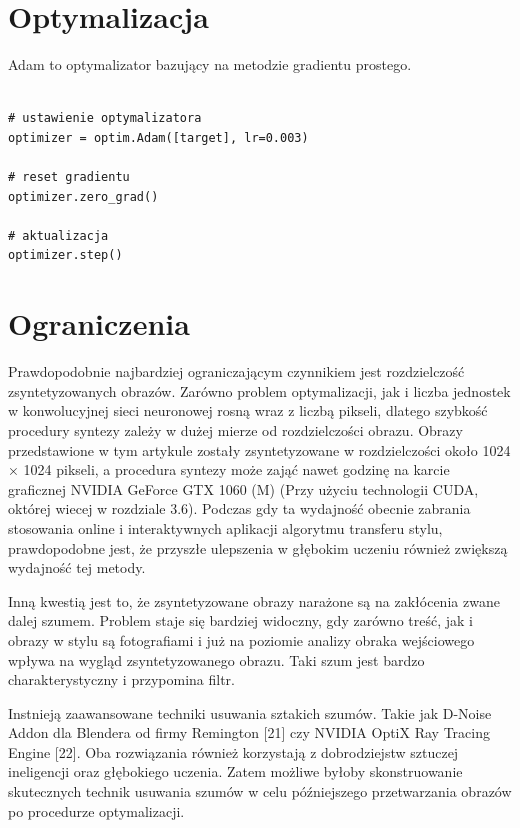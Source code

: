 \documentclass[brudnopis]{xmgr}
\begin{document}
\section{Optymalizacja\label{s:dsssl}}

Adam to optymalizator bazujący na metodzie gradientu prostego.

\begin{lstlisting}

# ustawienie optymalizatora
optimizer = optim.Adam([target], lr=0.003)
      
# reset gradientu
optimizer.zero_grad()
      
# aktualizacja
optimizer.step()

\end{lstlisting}

						
\section{Ograniczenia\label{s:dsssl}}

Prawdopodobnie najbardziej ograniczającym czynnikiem jest rozdzielczość zsyntetyzowanych obrazów. Zarówno problem optymalizacji, jak i liczba jednostek w konwolucyjnej sieci neuronowej rosną wraz z liczbą pikseli, dlatego szybkość procedury syntezy zależy w dużej mierze od rozdzielczości obrazu. Obrazy przedstawione w tym artykule zostały zsyntetyzowane w rozdzielczości około 1024 × 1024 pikseli, a procedura syntezy może zająć nawet godzinę na karcie graficznej NVIDIA GeForce GTX 1060 (M) (Przy użyciu technologii CUDA, októrej wiecej w rozdziale 3.6). Podczas gdy ta wydajność obecnie zabrania stosowania online i interaktywnych aplikacji algorytmu transferu stylu, prawdopodobne jest, że przyszłe ulepszenia w głębokim uczeniu również zwiększą wydajność tej metody.


Inną kwestią jest to, że zsyntetyzowane obrazy narażone są na zakłócenia zwane dalej szumem.  Problem staje się bardziej widoczny, gdy zarówno treść, jak i obrazy w stylu są fotografiami i już na poziomie analizy obraka wejściowego wpływa na wygląd zsyntetyzowanego obrazu. Taki szum jest bardzo charakterystyczny i przypomina filtr. 

Instnieją zaawansowane techniki usuwania sztakich szumów. Takie jak D-Noise Addon dla Blendera od firmy Remington [21] czy NVIDIA OptiX Ray Tracing Engine [22]. Oba rozwiązania również korzystają z dobrodziejstw sztuczej ineligencji oraz głębokiego uczenia. Zatem możliwe byłoby skonstruowanie skutecznych technik usuwania szumów w celu późniejszego przetwarzania obrazów po procedurze optymalizacji.
 \\
\end{document}

